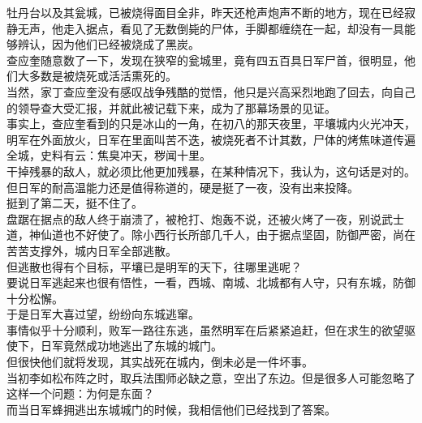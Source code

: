 \begin{multicols}{\theparacolNo}
牡丹台以及其瓮城，已被烧得面目全非，昨天还枪声炮声不断的地方，现在已经寂静无声，他走入据点，看见了无数倒毙的尸体，手脚都缠绕在一起，却没有一具能够辨认，因为他们已经被烧成了黑炭。\\

查应奎随意数了一下，发现在狭窄的瓮城里，竟有四五百具日军尸首，很明显，他们大多数是被烧死或活活熏死的。\\

当然，家丁查应奎没有感叹战争残酷的觉悟，他只是兴高采烈地跑了回去，向自己的领导查大受汇报，并就此被记载下来，成为了那幕场景的见证。\\

事实上，查应奎看到的只是冰山的一角，在初八的那天夜里，平壤城内火光冲天，明军在外面放火，日军在里面叫苦不迭，被烧死者不计其数，尸体的烤焦味道传遍全城，史料有云：焦臭冲天，秽闻十里。\\

干掉残暴的敌人，就必须比他更加残暴，在某种情况下，我认为，这句话是对的。\\

但日军的耐高温能力还是值得称道的，硬是挺了一夜，没有出来投降。\\

挺到了第二天，挺不住了。\\

盘踞在据点的敌人终于崩溃了，被枪打、炮轰不说，还被火烤了一夜，别说武士道，神仙道也不好使了。除小西行长所部几千人，由于据点坚固，防御严密，尚在苦苦支撑外，城内日军全部逃散。\\

但逃散也得有个目标，平壤已是明军的天下，往哪里逃呢？\\

要说日军逃起来也很有悟性，一看，西城、南城、北城都有人守，只有东城，防御十分松懈。\\

于是日军大喜过望，纷纷向东城逃窜。\\

事情似乎十分顺利，败军一路往东逃，虽然明军在后紧紧追赶，但在求生的欲望驱使下，日军竟然成功地逃出了东城的城门。\\

但很快他们就将发现，其实战死在城内，倒未必是一件坏事。\\

当初李如松布阵之时，取兵法围师必缺之意，空出了东边。但是很多人可能忽略了这样一个问题：为何是东面？\\

而当日军蜂拥逃出东城城门的时候，我相信他们已经找到了答案。\\


\end{multicols}
